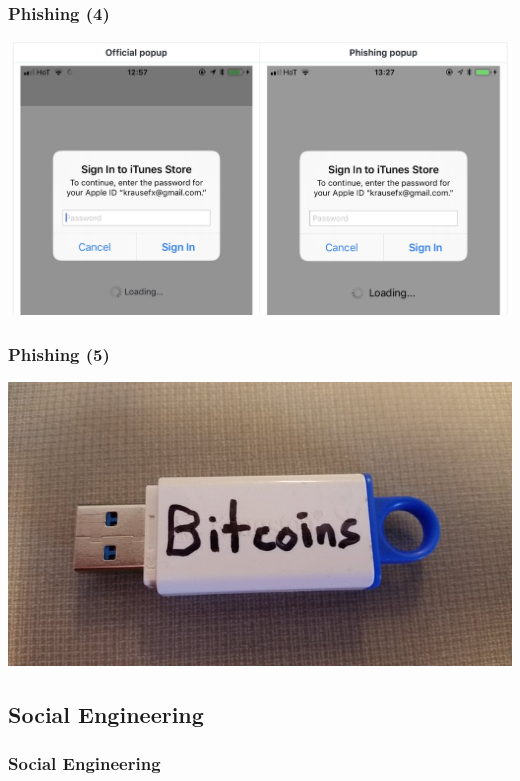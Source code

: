 \documentclass[aspectratio=169,dvipsnames]{beamer}
\begin{document}
\begin{frame}
\frametitle{Phishing (4)}
\begin{center}
\includegraphics[scale=0.175]{images/phishing_apple.png} 
\end{center}
\end{frame}

\begin{frame}
\frametitle{Phishing (5)}
\begin{center}
\includegraphics[scale=0.375]{images/bait} 
\end{center}
\end{frame}

\subsection{Social Engineering}

\begin{frame}
\frametitle{Social Engineering}
\end{frame}

\end{document}
